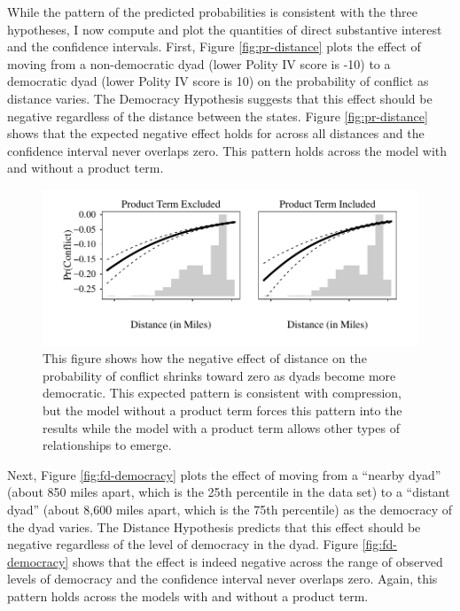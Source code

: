 \documentclass[12pt]{article}
\begin{document}
While the pattern of the predicted probabilities is consistent with the three hypotheses, I now compute and plot the quantities of direct substantive interest and the confidence intervals. First, Figure \ref{fig:pr-distance} plots the effect of moving from a non-democratic dyad (lower Polity IV score is -10) to a democratic dyad (lower Polity IV score is 10) on the probability of conflict as distance varies. The Democracy Hypothesis suggests that this effect should be negative regardless of the distance between the states. Figure \ref{fig:pr-distance} shows that the expected negative effect holds for across all distances and the confidence interval never overlaps zero. This pattern holds across the model with and without a product term.

        \begin{figure}[H]
        \begin{center}
        \includegraphics[scale = .8]{fig/fig-fd-distance.pdf}
        \end{center}\caption{This figure shows how the negative effect of distance on the probability of conflict shrinks toward zero as dyads become more democratic. This expected pattern is consistent with compression, but the model without a product term forces this pattern into the results while the model with a product term allows other types of relationships to emerge.}\label{fig:fd-distance}
        \end{figure}

Next, Figure \ref{fig:fd-democracy} plots the effect of moving from a ``nearby dyad'' (about 850 miles apart, which is the 25th percentile in the data set) to a ``distant dyad'' (about 8,600 miles apart, which is the 75th percentile) as the democracy of the dyad varies. The Distance Hypothesis predicts that this effect should be negative regardless of the level of democracy in the dyad. Figure \ref{fig:fd-democracy} shows that the effect is indeed negative across the range of observed levels of democracy and the confidence interval never overlaps zero. Again, this pattern holds across the models with and without a product term.
        
\end{document}
